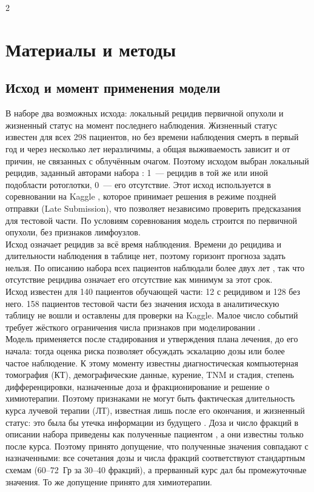\documentclass[11pt, a4paper]{article}
\begin{document}
\thispagestyle{firstpage}

\begin{multicols}{2}
\section*{Материалы и методы}

\subsection*{Исход и момент применения модели}

В наборе два возможных исхода: локальный рецидив первичной опухоли и жизненный статус на момент последнего наблюдения. Жизненный статус известен для всех 298 пациентов, но без времени наблюдения смерть в первый год и через несколько лет неразличимы, а общая выживаемость зависит и от причин, не связанных с облучённым очагом. Поэтому исходом выбран локальный рецидив, заданный авторами набора \cite{Elhalawani2017}: 1~--- рецидив в той же или иной подобласти ротоглотки, 0~--- его отсутствие. Этот исход используется в соревновании на Kaggle \cite{KaggleOPC}, которое принимает решения в режиме поздней отправки (Late Submission), что позволяет независимо проверить предсказания для тестовой части. По условиям соревнования модель строится по первичной опухоли, без признаков лимфоузлов.\vspace{6pt}\\
Исход означает рецидив за всё время наблюдения. Времени до рецидива и длительности наблюдения в таблице нет, поэтому горизонт прогноза задать нельзя. По описанию набора всех пациентов наблюдали более двух лет \cite{Elhalawani2017}, так что отсутствие рецидива означает его отсутствие как минимум за этот срок.\vspace{6pt}\\
Исход известен для 140 пациентов обучающей части: 12 с рецидивом и 128 без него. 158 пациентов тестовой части без значения исхода в аналитическую таблицу не вошли и оставлены для проверки на Kaggle. Малое число событий требует жёсткого ограничения числа признаков при моделировании \cite{Riley2020}.\vspace{6pt}\\
Модель применяется после стадирования и утверждения плана лечения, до его начала: тогда оценка риска позволяет обсуждать эскалацию дозы или более частое наблюдение. К этому моменту известны диагностическая компьютерная томография (КТ), демографические данные, курение, TNM и стадия, степень дифференцировки, назначенные доза и фракционирование и решение о химиотерапии. Поэтому признаками не могут быть фактическая длительность курса лучевой терапии (ЛТ), известная лишь после его окончания, и жизненный статус: это была бы утечка информации из будущего \cite{Kaufman2012}. Доза и число фракций в описании набора приведены как полученные пациентом \cite{Elhalawani2017}, а они известны только после курса. Поэтому принято допущение, что полученные значения совпадают с назначенными: все сочетания дозы и числа фракций соответствуют стандартным схемам (60--72~Гр за 30--40 фракций), а прерванный курс дал бы промежуточные значения. То же допущение принято для химиотерапии.


\end{multicols}
\end{document}
